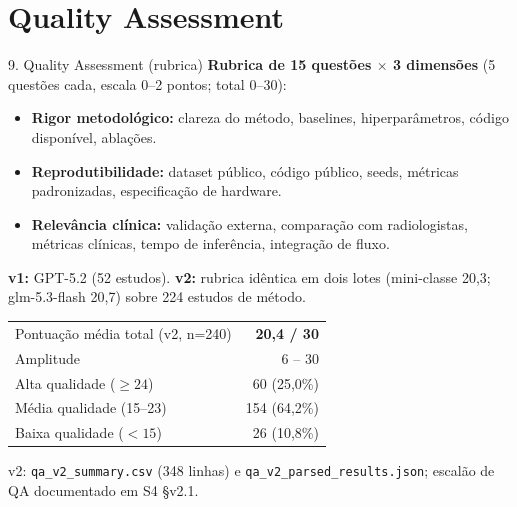 \documentclass[aspectratio=169]{beamer}
\begin{document}
\section{Quality Assessment}
\begin{frame}{9. Quality Assessment (rubrica)}
\small
\textbf{Rubrica de 15 questões $\times$ 3 dimensões} (5 questões cada, escala 0--2 pontos; total 0--30):

\begin{itemize}
	\item \textbf{Rigor metodológico:} clareza do método, baselines, hiperparâmetros, código disponível, ablações.
	\item \textbf{Reprodutibilidade:} dataset público, código público, seeds, métricas padronizadas, especificação de hardware.
	\item \textbf{Relevância clínica:} validação externa, comparação com radiologistas, métricas clínicas, tempo de inferência, integração de fluxo.
\end{itemize}

\textbf{v1:} GPT-5.2 (52 estudos). \textbf{v2:} rubrica idêntica em dois lotes (mini-classe 20,3; glm-5.3-flash 20,7) sobre 224 estudos de método.

\begin{table}
\centering
\begin{tabular}{lr}
\toprule
Pontuação média total (v2, n=240) & \textbf{20,4 / 30} \\
Amplitude & 6 -- 30 \\
Alta qualidade ($\geq 24$) & 60 (25,0\%) \\
Média qualidade (15--23) & 154 (64,2\%) \\
Baixa qualidade ($<15$) & 26 (10,8\%) \\
\bottomrule
\end{tabular}
\end{table}
\footnotesize v2: \texttt{qa\_v2\_summary.csv} (348 linhas) e \texttt{qa\_v2\_parsed\_results.json}; escalão de QA documentado em S4 \S v2.1.
\end{frame}

\end{document}
